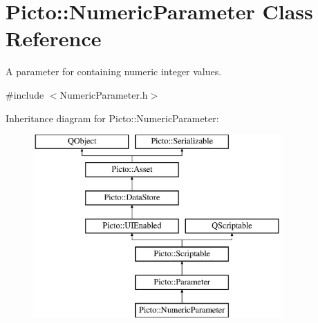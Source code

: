 \hypertarget{class_picto_1_1_numeric_parameter}{\section{Picto\-:\-:Numeric\-Parameter Class Reference}
\label{class_picto_1_1_numeric_parameter}
}


A parameter for containing numeric integer values.  




{\ttfamily \#include $<$Numeric\-Parameter.\-h$>$}

Inheritance diagram for Picto\-:\-:Numeric\-Parameter\-:\begin{figure}[H]
\begin{center}
\leavevmode
\includegraphics[height=7.000000cm]{class_picto_1_1_numeric_parameter}
\end{center}
\end{figure}
